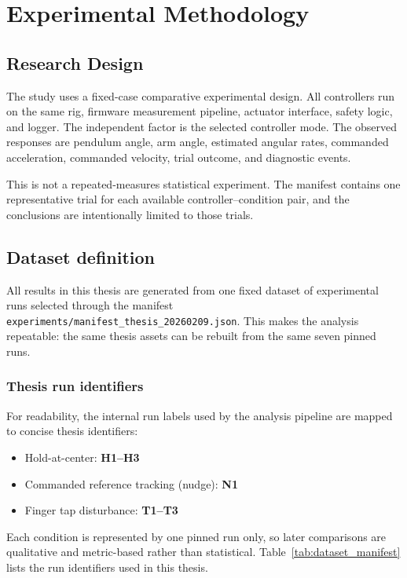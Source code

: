 \chapter{Experimental Methodology}
\label{ch:experiments}
\label{ch:methodology}

\section{Research Design}
The study uses a fixed-case comparative experimental design. All controllers
run on the same rig, firmware measurement pipeline, actuator interface, safety
logic, and logger. The independent factor is the selected controller mode.
The observed responses are pendulum angle, arm angle, estimated angular
rates, commanded acceleration, commanded velocity, trial outcome, and
diagnostic events.

This is not a repeated-measures statistical experiment. The manifest contains
one representative trial for each available controller--condition pair, and
the conclusions are intentionally limited to those trials.

\section{Dataset definition}
All results in this thesis are generated from one fixed dataset of experimental runs selected through the manifest \texttt{experiments/manifest\_thesis\_20260209.json}. This makes the analysis repeatable: the same thesis assets can be rebuilt from the same seven pinned runs.

\subsection*{Thesis run identifiers}
For readability, the internal run labels used by the analysis pipeline are mapped to concise thesis identifiers:
\begin{itemize}
  \item Hold-at-center: \textbf{H1--H3}
  \item Commanded reference tracking (nudge): \textbf{N1}
  \item Finger tap disturbance: \textbf{T1--T3}
\end{itemize}
Each condition is represented by one pinned run only, so later comparisons are qualitative and metric-based rather than statistical. Table~\ref{tab:dataset_manifest} lists the run identifiers used in this thesis.

